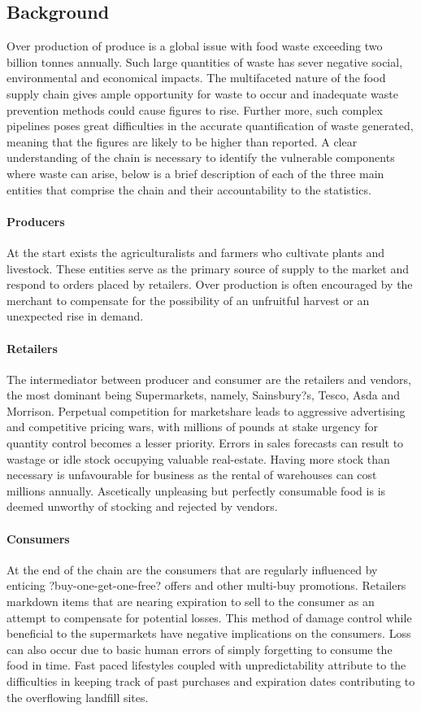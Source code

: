 \documentclass[a4paper, 11pt]{article}
\begin{document}
\subsection{Background}
Over production of produce is a global issue with food waste exceeding two billion tonnes annually. Such large quantities of waste has sever negative social, environmental and economical impacts. The multifaceted nature of the food supply chain gives ample opportunity for waste to occur and inadequate waste prevention methods could cause figures to rise. Further more, such complex pipelines poses great difficulties in the accurate quantification of waste generated, meaning that the figures are likely to be higher than reported. A clear understanding of the chain is necessary to identify the vulnerable components where waste can arise, below is a brief description of each of the three main entities that comprise the chain and their accountability to the statistics.

\paragraph{Producers}At the start exists the agriculturalists and farmers who cultivate plants and livestock. These entities serve as the primary source of supply to the market and respond to orders placed by retailers. Over production is often encouraged by the merchant to compensate for the possibility of an unfruitful harvest or an unexpected rise in demand. 

\paragraph{Retailers}The intermediator between producer and consumer are the retailers and vendors, the most dominant being Supermarkets, namely, Sainsbury?s, Tesco, Asda and Morrison. Perpetual competition for marketshare leads to aggressive advertising and competitive pricing wars, with millions of pounds at stake urgency for quantity control becomes a lesser priority. Errors in sales forecasts can result to wastage or idle stock occupying valuable real-estate. Having more stock than necessary is unfavourable for business as the rental of warehouses can cost millions annually. Ascetically unpleasing but perfectly consumable food is is deemed unworthy of stocking and rejected by vendors.

\paragraph{Consumers}At the end of the chain are the consumers that are regularly influenced by enticing ?buy-one-get-one-free? offers and other multi-buy promotions. Retailers markdown items that are nearing expiration to sell  to the consumer as an attempt to compensate for potential losses. This method of damage control while beneficial to the supermarkets have negative implications on the consumers. Loss can also occur due to basic human errors of simply forgetting to consume the food in time. Fast paced lifestyles coupled with unpredictability attribute to the difficulties in keeping track of past purchases and expiration dates contributing to the overflowing landfill sites. 
\end{document}
